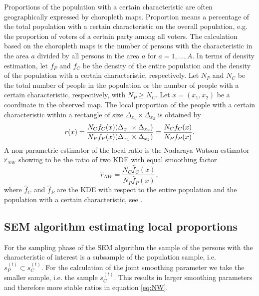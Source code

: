 Proportions of the population with a certain characteristic are often geographically expressed by choropleth maps. Proportion means a percentage of the total population with a certain characteristic on the overall population, e.g. the proportion of voters of a certain party among all voters. 
The calculation based on the choropleth maps is  the number of persons with the characteristic in the area $a$ divided by all persons in the area $a$ for $a = 1, \dots, A$. 
In terms of density estimation, let $f_P$ and $f_C$ be the density of the entire population and the density of the population with 
a certain characteristic, respectively. 
Let $N_P$ and $N_C$ be the total number of people in the population or the number of people with a certain characteristic, respectively, with $N_P \geq N_C$. Let $x = (x_1, x_2)$ be a coordinate in the observed map. The local proportion of the people with a certain characteristic within a rectangle of size $\Delta_{x_1} \times \Delta_{x_2}$ is obtained by 
\begin{equation*}
    r(x) =  \frac{N_C f_C(x) (\Delta_{x_1} \times \Delta_{x_2})}{N_P f_P(x) (\Delta_{x_1} \times \Delta_{x_2})} \\
         =  \frac{N_C f_C(x)}{N_P f_P(x)}. 
\end{equation*}
A non-parametric estimator of the local ratio is the Nadaraya-Watson estimator $\hat{r}_{NW}$ showing to be the ratio of two KDE with equal smoothing factor
\begin{equation}\label{eq:NW}
    \hat{r}_{NW} = \frac{N_C \hat{f}_C(x)}{N_P \hat{f}_P(x)}, 
\end{equation}
where $\hat{f}_C$ and $\hat{f}_P$ are the KDE with respect to the entire population and the population with a certain characteristic, see \cite{Haerdle}. 

\hypertarget{SEM-algorithm-estimating-local-proportions}{%
\subsection{SEM algorithm estimating local proportions}\label{SEM-algorithm-estimating-local-proportions}}


For the sampling phase of the SEM algorithm the sample of the persons with the characteristic of interest is a subsample of the population sample, i.e. $s_P^{(t)} \subset s_C^{(t)}$. For the calculation of the joint smoothing parameter we take the smaller sample, i.e. the sample $s_C^{(t)}$. This results in larger smoothing parameters and therefore more stable ratios in equation \ref{eq:NW}.

